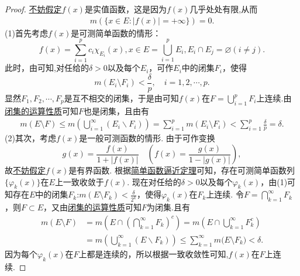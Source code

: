 \documentclass[../../main.tex]{subfiles}
\begin{document}
\begin{proof}
\hyperlink{不妨假定f是实值函数的原因}{不妨假定}\(f(x)\)是实值函数，这是因为$f(x)$几乎处处有限,从而
\begin{align*}
m(\{x \in E: |f(x)| = +\infty\}) = 0.
\end{align*}
(1)首先考虑\(f(x)\)是可测简单函数的情形：
\[f(x) = \sum_{i = 1}^{p} c_{i} \chi_{E_{i}}(x), x \in E = \bigcup_{i = 1}^{p} E_{i}, E_{i} \cap E_{j} = \varnothing (i \neq j).\]
此时，由可知,对任给的\(\delta > 0\)以及每个\(E_{i}\)，可作\(E_{i}\)中的闭集\(F_{i}\)，使得
\[m(E_{i} \setminus F_{i}) < \frac{\delta}{p}, \quad i = 1,2,\cdots,p.\]
显然\(F_{1},F_{2},\cdots,F_{p}\)是互不相交的闭集，于是由可知\(f(x)\)在\(F = \bigcup_{i = 1}^{p} F_{i}\)上连续.由\hyperref[theorem:闭集的运算性质]{闭集的运算性质}可知\(F\)也是闭集，且由有
\begin{align*}
m(E \setminus F) \leqslant m(\bigcup_{i=1}^{\infty}(E_i\backslash F_i))=\sum_{i = 1}^{p} m(E_{i} \setminus F_{i}) < \sum_{i = 1}^{p} \frac{\delta}{p} = \delta.
\end{align*}
(2)其次，考虑\(f(x)\)是一般可测函数的情形. 由于可作变换
\[g(x) = \frac{f(x)}{1 + |f(x)|} \quad \left(f(x) = \frac{g(x)}{1 - |g(x)|}\right),\]
故\hyperlink{不妨设f有界的原因}{不妨假定}\(f(x)\)是有界函数. 根据\hyperref[theorem:简单函数逼近定理]{简单函数逼近定理}可知，存在可测简单函数列\(\{\varphi_{k}(x)\}\)在\(E\)上一致收敛于\(f(x)\). 现在对任给的\(\delta > 0\)以及每个\(\varphi_{k}(x)\)，由(1)可知存在\(E\)中的闭集\(F_{k}\):\(m(E \setminus F_{k}) < \frac{\delta}{2^{k}}\)，使得\(\varphi_{k}(x)\)在\(F_{k}\)上连续. 令\(F = \bigcap_{k = 1}^{\infty} F_{k}\)，则\(F \subset E\)，又由\hyperref[theorem:闭集的运算性质]{闭集的运算性质}可知$F$为闭集.且有
\begin{align*}
m(E\setminus F)&=m(E\cap \left( \bigcap_{k=1}^{\infty}{F_k} \right) ^c)=m(E\cap \bigcup_{k=1}^{\infty}{F_{k}^{c}})
\\
&=m(\bigcup_{k=1}^{\infty}{\left( E\backslash F_k \right)})\leqslant \sum_{k=1}^{\infty}{m(E}\setminus F_k)<\delta .
\end{align*}
因为每个\(\varphi_{k}(x)\)在\(F\)上都是连续的，所以根据一致收敛性可知,\(f(x)\)在\(F\)上连续. 
\end{proof}
\end{document}
